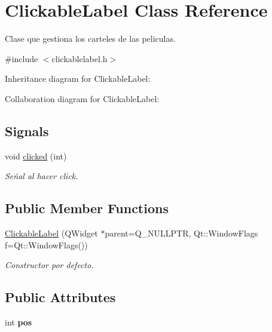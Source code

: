 \hypertarget{classClickableLabel}{}\section{Clickable\+Label Class Reference}
\label{classClickableLabel}


Clase que gestiona los carteles de las peliculas.  




{\ttfamily \#include $<$clickablelabel.\+h$>$}



Inheritance diagram for Clickable\+Label\+:


Collaboration diagram for Clickable\+Label\+:
\subsection*{Signals}
\begin{DoxyCompactItemize}
\item 
void \hyperlink{classClickableLabel_a9cebe7779e28dc669649511f87ae1a26}{clicked} (int)
\begin{DoxyCompactList}\small\item\em Señal al hacer click. \end{DoxyCompactList}\end{DoxyCompactItemize}
\subsection*{Public Member Functions}
\begin{DoxyCompactItemize}
\item 
\hyperlink{classClickableLabel_ac2846619ea62f7fd6ac799d09302b786}{Clickable\+Label} (Q\+Widget $\ast$parent=Q\+\_\+\+N\+U\+L\+L\+P\+TR, Qt\+::\+Window\+Flags f=Qt\+::\+Window\+Flags())
\begin{DoxyCompactList}\small\item\em Constructor por defecto. \end{DoxyCompactList}\end{DoxyCompactItemize}
\subsection*{Public Attributes}
\begin{DoxyCompactItemize}
\item 
\mbox{\label{classClickableLabel_a7246a4f9c4079031e216e4f1ee7375ef}} 
int {\bfseries pos}
\end{DoxyCompactItemize}
